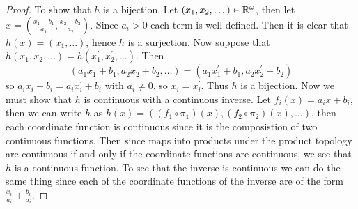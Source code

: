     \question 

    \begin{proof}
        To show that $h$ is a bijection, Let $(x_1, x_2, \dots) \in \mathbb{R}^\omega$, then let $x = (\frac{x_1 - b_1}{a_1}, \frac{x_2-b_2}{a_2})$. Since $a_i > 0$ each term is well defined. Then it is clear that $h(x) = (x_1, \dots)$, hence 
        $h$ is a surjection. Now suppose that $h(x_1, x_2, \dots) = h(x_1^\prime, x_2^\prime, \dots)$. Then 
        \[(a_1x_1 + b_1, a_2x_2 + b_2, \dots) = (a_1x_1^\prime + b_1, a_2x_2^\prime + b_2)\]
        so $a_ix_i + b_i = a_ix_i^\prime + b_i$ with $a_i \neq 0$, so $x_i = x_i^\prime$. Thus $h$ is a bijection. Now we must show that $h$ is continuous with a continuous inverse. Let $f_i(x) = a_ix + b_i$, then we can write $h$ 
        as $h(x) = ((f_1 \circ \pi_1)(x), (f_2 \circ \pi_2)(x), \dots )$, then each coordinate function is continuous since it is the composistion of two continuous functions. Then since maps into products under the product topology are continuous 
        if and only if the coordinate functions are continuous, we see that $h$ is a continuous function. To see that the inverse is continuous we can do the same thing since each of the coordinate functions of the inverse are of the form 
        $\frac{x_i}{a_i} + \frac{b_i}{a_i}$. 
    \end{proof}

    
